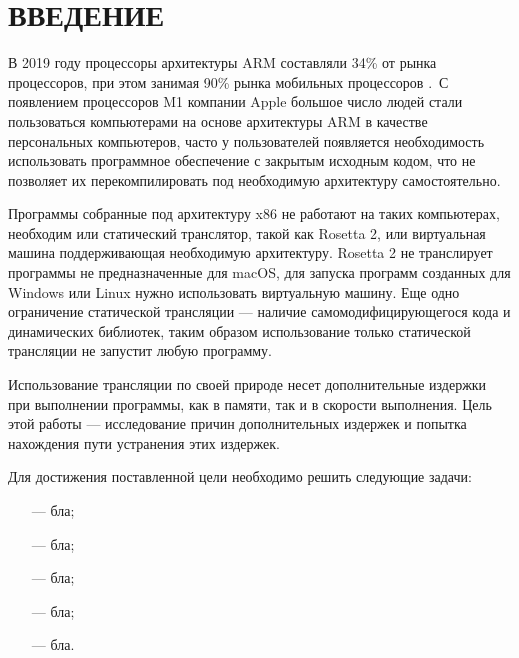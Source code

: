 \section*{ВВЕДЕНИЕ}

В 2019 году процессоры архитектуры ARM составляли 34\% от рынка процессоров, при этом занимая 90\% рынка мобильных процессоров \cite{arm_report}. С появлением процессоров M1 компании Apple большое число людей стали пользоваться компьютерами на основе архитектуры ARM в качестве персональных компьютеров, часто у пользователей появляется необходимость использовать программное обеспечение с закрытым исходным кодом, что не позволяет их перекомпилировать под необходимую архитектуру самостоятельно.

Программы собранные под архитектуру x86 не работают на таких компьютерах, необходим или статический транслятор, такой как Rosetta 2, или виртуальная машина поддерживающая необходимую архитектуру. Rosetta 2 не транслирует программы не предназначенные для macOS, для запуска программ созданных для Windows или Linux нужно использовать виртуальную машину. Еще одно ограничение статической трансляции --- наличие самомодифицирующегося кода и динамических библиотек, таким образом использование только статической трансляции не запустит любую программу. \cite{fast_bin}

Использование трансляции по своей природе несет дополнительные издержки при выполнении программы, как в памяти, так и в скорости выполнения. Цель этой работы --- исследование причин дополнительных издержек и попытка нахождения пути устранения этих издержек.

Для достижения поставленной цели необходимо решить следующие задачи:

\begin{itemize}[leftmargin=1.6\parindent]
	\item[---] бла;
	\item[---] бла;
	\item[---] бла;
	\item[---] бла;
	\item[---] бла.
\end{itemize}

\pagebreak